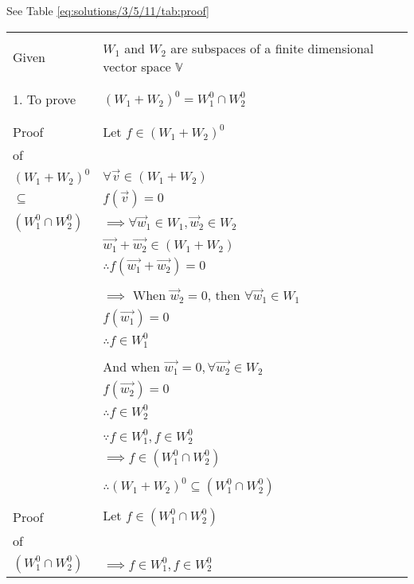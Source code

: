 See Table     \ref{eq:solutions/3/5/11/tab:proof}

\onecolumn
\begin{longtable}{|l|l|}
    \hline
        & \\
        Given &  $W_1$ and $W_2$ are subspaces of a finite dimensional vector space $\mathbb V$\\
        & \\
        \hline
        & \\
        1. To prove & $(W_1 + W_2)^0 = W_1^0 \cap W_2^0$\\
        & \\
    \hline
        & \\
        Proof & Let $f \in (W_1 + W_2)^0$\\
        of & \\
        $(W_1 + W_2)^0$ & $\forall \vec{v} \in (W_1 + W_2)$\\
        $\subseteq$ & $f(\vec{v}) = 0$\\
        $(W_1^0 \cap W_2^0)$ & $\implies \forall \vec{w}_1 \in W_1, \vec{w}_2 \in W_2$\\
        & $\vec{w_1} + \vec{w_2} \in (W_1 + W_2)$\\
        & $\therefore f(\vec{w_1} + \vec{w_2}) = 0$\\
        & \\
        & $\implies$ When $\vec{w}_2 = 0$, then $\forall \vec{w}_1 \in W_1$\\
        & $f(\vec{w_1}) = 0$\\
        & $\therefore f \in W_1^0$\\
        &\\
        & And when $\vec{w_1} = 0, \forall \vec{w_2} \in W_2$\\
        & $f(\vec{w_2}) = 0$\\
        & $\therefore f \in W_2^0$\\
        & \\
        & $\because f \in W_1^0, f \in W_2^0$\\
        & $\implies f \in (W_1^0 \cap W_2^0)$\\
        & \\
        & $\therefore (W_1 + W_2)^0 \subseteq (W_1^0 \cap W_2^0)$\\
    \hline
        & \\
        Proof & Let $f \in (W_1^0 \cap W_2^0)$\\
        of & \\
        $(W_1^0 \cap W_2^0)$ & $\implies f \in W_1^0, f \in W_2^0$\\

\end{longtable}
